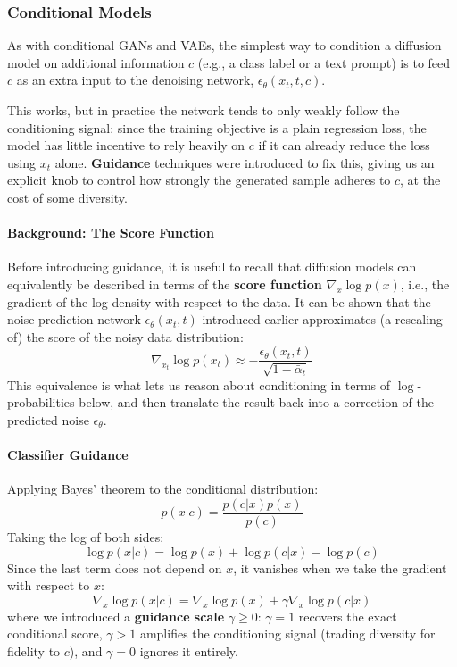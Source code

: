 \subsubsection{Conditional Models}
As with conditional GANs and VAEs, the simplest way to condition a diffusion model on additional information \(c\) (e.g., a class label or a text prompt) is to feed \(c\) as an extra input to the denoising network, \(\epsilon_\theta(x_t, t, c)\).

This works, but in practice the network tends to only weakly follow the conditioning signal: since the training objective is a plain regression loss, the model has little incentive to rely heavily on \(c\) if it can already reduce the loss using \(x_t\) alone. \textbf{Guidance} techniques were introduced to fix this, giving us an explicit knob to control how strongly the generated sample adheres to \(c\), at the cost of some diversity.

\paragraph{Background: The Score Function}
Before introducing guidance, it is useful to recall that diffusion models can equivalently be described in terms of the \textbf{score function} \(\nabla_x \log p(x)\), i.e., the gradient of the log-density with respect to the data.
It can be shown that the noise-prediction network \(\epsilon_\theta(x_t, t)\) introduced earlier approximates (a rescaling of) the score of the noisy data distribution:
\[
    \nabla_{x_t} \log p(x_t) \approx - \frac{\epsilon_\theta(x_t, t)}{\sqrt{1 - \bar\alpha_t}}
\]
This equivalence is what lets us reason about conditioning in terms of \(\log\)-probabilities below, and then translate the result back into a correction of the predicted noise \(\epsilon_\theta\).

\paragraph{Classifier Guidance}
Applying Bayes' theorem to the conditional distribution:
\[
    p(x|c) = \frac{p(c|x)p(x)}{p(c)}
\]
Taking the log of both sides:
\[
    \log p(x|c) = \log p(x) + \log p(c|x) - \log p(c)
\]
Since the last term does not depend on \(x\), it vanishes when we take the gradient with respect to \(x\):
\begin{equation}
    \label{eq:classifier-guidance}
    \nabla_x \log p(x|c) = \nabla_x \log p(x) + \gamma \nabla_x \log p(c|x)
\end{equation}
where we introduced a \textbf{guidance scale} \(\gamma \geq 0\): \(\gamma = 1\) recovers the exact conditional score, \(\gamma > 1\) amplifies the conditioning signal (trading diversity for fidelity to \(c\)), and \(\gamma = 0\) ignores it entirely.

